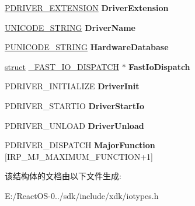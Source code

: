 \begin{DoxyCompactItemize}
\mbox{\label{struct___d_r_i_v_e_r___o_b_j_e_c_t_a7e5dc9baae90572acab2d120eb80777c}} 
\hyperlink{struct___d_r_i_v_e_r___e_x_t_e_n_s_i_o_n}{P\+D\+R\+I\+V\+E\+R\+\_\+\+E\+X\+T\+E\+N\+S\+I\+ON} {\bfseries Driver\+Extension}
\item 
\mbox{\label{struct___d_r_i_v_e_r___o_b_j_e_c_t_ad9f9e0f5c2b147cc664df4116a13c877}} 
\hyperlink{struct___u_n_i_c_o_d_e___s_t_r_i_n_g}{U\+N\+I\+C\+O\+D\+E\+\_\+\+S\+T\+R\+I\+NG} {\bfseries Driver\+Name}
\item 
\mbox{\label{struct___d_r_i_v_e_r___o_b_j_e_c_t_a112fcbcac6369066a448fd7622670535}} 
\hyperlink{struct___u_n_i_c_o_d_e___s_t_r_i_n_g}{P\+U\+N\+I\+C\+O\+D\+E\+\_\+\+S\+T\+R\+I\+NG} {\bfseries Hardware\+Database}
\item 
\mbox{\label{struct___d_r_i_v_e_r___o_b_j_e_c_t_a3442486956649d01b42082bb69e686f5}} 
\hyperlink{interfacestruct}{struct} \hyperlink{struct___f_a_s_t___i_o___d_i_s_p_a_t_c_h}{\+\_\+\+F\+A\+S\+T\+\_\+\+I\+O\+\_\+\+D\+I\+S\+P\+A\+T\+CH} $\ast$ {\bfseries Fast\+Io\+Dispatch}
\item 
\mbox{\label{struct___d_r_i_v_e_r___o_b_j_e_c_t_a7a21171ec2be18dd1ec5b8c74fc0c425}} 
P\+D\+R\+I\+V\+E\+R\+\_\+\+I\+N\+I\+T\+I\+A\+L\+I\+ZE {\bfseries Driver\+Init}
\item 
\mbox{\label{struct___d_r_i_v_e_r___o_b_j_e_c_t_a6208ef9282a28d26f5ef147bb9313f57}} 
P\+D\+R\+I\+V\+E\+R\+\_\+\+S\+T\+A\+R\+T\+IO {\bfseries Driver\+Start\+Io}
\item 
\mbox{\label{struct___d_r_i_v_e_r___o_b_j_e_c_t_ac8240be40fd14318840f1c519c7ad7a2}} 
P\+D\+R\+I\+V\+E\+R\+\_\+\+U\+N\+L\+O\+AD {\bfseries Driver\+Unload}
\item 
\mbox{\label{struct___d_r_i_v_e_r___o_b_j_e_c_t_a177654e7cb46dd09a0c481f1d1188203}} 
P\+D\+R\+I\+V\+E\+R\+\_\+\+D\+I\+S\+P\+A\+T\+CH {\bfseries Major\+Function} \mbox{[}I\+R\+P\+\_\+\+M\+J\+\_\+\+M\+A\+X\+I\+M\+U\+M\+\_\+\+F\+U\+N\+C\+T\+I\+ON+1\mbox{]}
\end{DoxyCompactItemize}


该结构体的文档由以下文件生成\+:\begin{DoxyCompactItemize}
\item 
E\+:/\+React\+O\+S-\/0../sdk/include/xdk/iotypes.\+h\end{DoxyCompactItemize}

